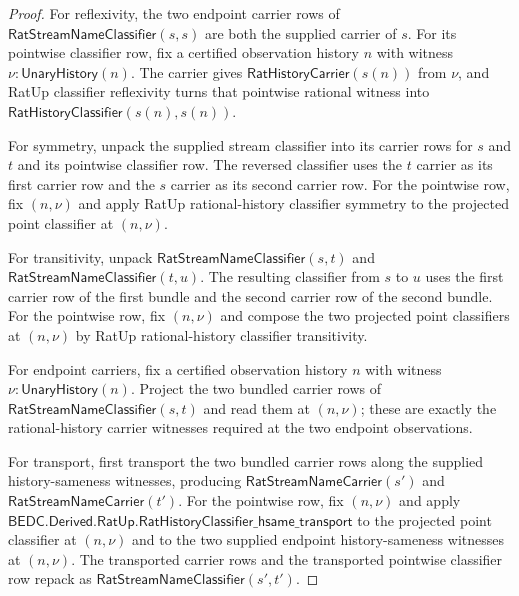 \begin{proof}
For reflexivity, the two endpoint carrier rows of
$\mathsf{RatStreamNameClassifier}(s,s)$ are both the supplied carrier of $s$.
For its pointwise classifier row, fix a certified observation history $n$ with
witness $\nu:\mathsf{UnaryHistory}(n)$. The carrier gives
$\mathsf{RatHistoryCarrier}(s(n))$ from $\nu$, and RatUp classifier
reflexivity turns that pointwise rational witness into
$\mathsf{RatHistoryClassifier}(s(n),s(n))$.

For symmetry, unpack the supplied stream classifier into its carrier rows for
$s$ and $t$ and its pointwise classifier row. The reversed classifier uses the
$t$ carrier as its first carrier row and the $s$ carrier as its second carrier
row. For the pointwise row, fix $(n,\nu)$ and apply RatUp rational-history
classifier symmetry to the projected point classifier at $(n,\nu)$.

For transitivity, unpack $\mathsf{RatStreamNameClassifier}(s,t)$ and
$\mathsf{RatStreamNameClassifier}(t,u)$. The resulting classifier from $s$ to
$u$ uses the first carrier row of the first bundle and the second carrier row
of the second bundle. For the pointwise row, fix $(n,\nu)$ and compose the two
projected point classifiers at $(n,\nu)$ by RatUp rational-history classifier
transitivity.

For endpoint carriers, fix a certified observation history $n$ with witness
$\nu:\mathsf{UnaryHistory}(n)$. Project the two bundled carrier rows of
$\mathsf{RatStreamNameClassifier}(s,t)$ and read them at $(n,\nu)$; these are
exactly the rational-history carrier witnesses required at the two endpoint
observations.

For transport, first transport the two bundled carrier rows along the supplied
history-sameness witnesses, producing $\mathsf{RatStreamNameCarrier}(s')$ and
$\mathsf{RatStreamNameCarrier}(t')$. For the pointwise row, fix $(n,\nu)$ and
apply
$\mathsf{BEDC.Derived.RatUp.RatHistoryClassifier\_hsame\_transport}$ to the
projected point classifier at $(n,\nu)$ and to the two supplied endpoint
history-sameness witnesses at $(n,\nu)$. The transported carrier rows and the
transported pointwise classifier row repack as
$\mathsf{RatStreamNameClassifier}(s',t')$.
\end{proof}


